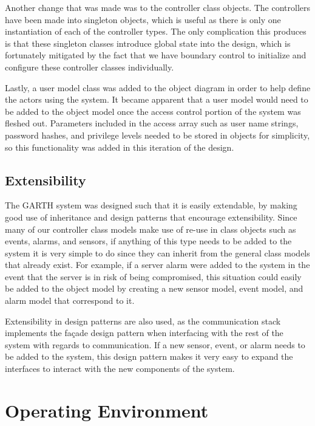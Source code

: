 \documentclass{report}
\begin{document}
Another change that was made was to the controller class objects. The controllers
have been made into singleton objects, which is useful as there is only one
instantiation of each of the controller types. The only complication this produces
is that these singleton classes introduce global state into the design, which
is fortunately mitigated by the fact that we have boundary control to initialize
and configure these controller classes individually. 

Lastly, a user model class was added to the object diagram in order to help
define the actors using the system. It became apparent that a user model would
need to be added to the object model once the access control portion of the 
system was fleshed out. Parameters included in the access array such as user
name strings, password hashes, and privilege levels needed to be stored in
objects for simplicity, so this functionality was added in this iteration of the
design.

\section{Extensibility}

The GARTH system was designed such that it is easily extendable, by making good
use of inheritance and design patterns that encourage extensibility. Since many
of our controller class models make use of re-use in class objects such as
events, alarms, and sensors, if anything of this type needs to be added to the
system it is very simple to do since they can inherit from the general class
models that already exist. For example, if a server alarm were added to the
system in the event that the server is in risk of being compromised, this
situation could easily be added to the object model by creating a new sensor
model, event model, and alarm model that correspond to it.

Extensibility in design patterns are also used, as the communication stack
implements the fa\c{c}ade design pattern when interfacing with the rest of the
system with regards to communication. If a new sensor, event, or alarm needs to
be added to the system, this design pattern makes it very easy to expand the
interfaces to interact with the new components of the system.

\chapter{Operating Environment} %
\label{ch:operating-environment}
\end{document}
